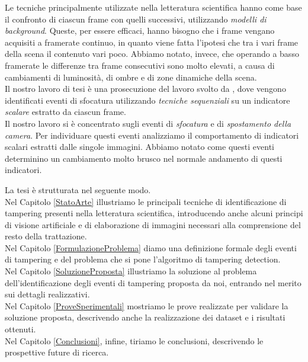 Le tecniche principalmente utilizzate nella letteratura scientifica hanno come base il confronto di ciascun frame con quelli successivi, utilizzando \textit{modelli di background}.
Queste, per essere efficaci, hanno bisogno che i frame vengano acquisiti a framerate continuo, in quanto viene fatta l'ipotesi che tra i vari frame della scena il contenuto vari poco.
Abbiamo notato, invece, che operando a basso framerate le differenze tra frame consecutivi sono molto elevati, a causa di cambiamenti di luminosit\`a, di ombre e di zone dinamiche della scena.\\
Il nostro lavoro di tesi \`e una prosecuzione del lavoro svolto da \cite{alippi2010detecting}, dove vengono identificati eventi di sfocatura utilizzando \textit{tecniche sequenziali} su un indicatore \textit{scalare} estratto da ciascun frame.\\
Il nostro lavoro si \`e concentrato sugli eventi di \textit{sfocatura} e di \textit{spostamento della camera}.
Per individuare questi eventi analizziamo il comportamento di indicatori scalari estratti dalle singole immagini.
Abbiamo notato come questi eventi determinino un cambiamento molto brusco nel normale andamento di questi indicatori.


\noindent La tesi \`e strutturata nel seguente modo.\\
Nel Capitolo \ref{StatoArte} illustriamo le principali tecniche di identificazione di tampering presenti nella letteratura scientifica, introducendo anche alcuni principi di visione artificiale e di elaborazione di immagini necessari alla comprensione del resto della trattazione.\\
Nel Capitolo \ref{FormulazioneProblema} diamo una definizione formale degli eventi di tampering e del problema che si pone l'algoritmo di tampering detection.\\
Nel Capitolo \ref{SoluzioneProposta} illustriamo la soluzione al problema dell'identificazione degli eventi di tampering proposta da noi, entrando nel merito sui dettagli realizzativi.\\
Nel Capitolo \ref{ProveSperimentali} mostriamo le prove realizzate per validare la soluzione proposta, descrivendo anche la realizzazione dei dataset e i risultati ottenuti.\\
Nel Capitolo \ref{Conclusioni}, infine, tiriamo le conclusioni, descrivendo le prospettive future di ricerca.
	
